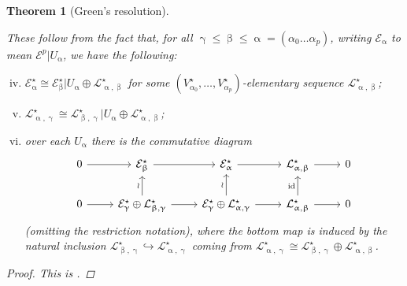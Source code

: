 \documentclass[11pt,fleqn]{article}
\theoremstyle{plain}
\newtheorem{theorem}{Theorem}[subsection]
\theoremstyle{definition}
\theoremstyle{remark}
\numberwithin{equation}{theorem}
\newcommand{\anotherbullet}{\star}
\newcommand{\restricted}{\mathbin{\big\vert}}
\newcommand{\id}{\mathrm{id}}
\begin{document}
\begin{theorem}[Green's resolution]
\begin{enumerate}[(i)]
            \end{enumerate}
            These follow from the fact that, for all ${\upgamma}\leqslant{\upbeta}\leqslant{\upalpha}=(\alpha_0\ldots\alpha_p)$, writing $\mathcal{E}_{\upalpha}$ to mean $\mathcal{E}^p\restricted U_{\upalpha}$, we have the following:
            \begin{enumerate}[(i)]
                \setcounter{enumi}{3}
                \item $\mathcal{E}_{\upalpha}^\anotherbullet \cong \mathcal{E}^\anotherbullet_{\upbeta}\restricted U_{\upalpha}\oplus \mathcal{L}_{{\upalpha},{\upbeta}}^\anotherbullet$ for some $(V^\anotherbullet_{\alpha_0},\ldots,V^\anotherbullet_{\alpha_p})$-elementary sequence $\mathcal{L}_{{\upalpha},{\upbeta}}^\anotherbullet$;
                \item $\mathcal{L}_{{\upalpha},{\upgamma}}^\anotherbullet \cong \mathcal{L}_{{\upbeta},{\upgamma}}^\anotherbullet\restricted U_{\upalpha}\oplus \mathcal{L}_{{\upalpha},{\upbeta}}^\anotherbullet$;
                \item over each $U_{\upalpha}$ there is the commutative diagram
                    \begin{equation*}
                        \begin{tikzcd}
                            0 \rar
                            &\mathcal{E}_{\upbeta}^\anotherbullet \rar
                            &\mathcal{E}_{\upalpha}^\anotherbullet \rar
                            &\mathcal{L}_{{\upalpha},{\upbeta}}^\anotherbullet \rar
                            &0\\
                            0 \rar
                            &\mathcal{E}_{\upgamma}^\anotherbullet\oplus \mathcal{L}_{{\upbeta},{\upgamma}}^\anotherbullet \rar \uar{\wr}
                            &\mathcal{E}_{\upgamma}^\anotherbullet\oplus \mathcal{L}_{{\upalpha},{\upgamma}}^\anotherbullet \rar \uar{\wr}
                            &\mathcal{L}_{{\upalpha},{\upbeta}}^\anotherbullet \rar \uar{\id}
                            &0
                        \end{tikzcd}
                    \end{equation*}
                    (omitting the restriction notation), where the bottom map is induced by the natural inclusion $\mathcal{L}_{{\upbeta},{\upgamma}}^\anotherbullet\hookrightarrow \mathcal{L}_{{\upalpha},{\upgamma}}^\anotherbullet$ coming from $\mathcal{L}_{{\upalpha},{\upgamma}}^\anotherbullet \cong \mathcal{L}_{{\upbeta},{\upgamma}}^\anotherbullet\oplus \mathcal{L}_{{\upalpha},{\upbeta}}^\anotherbullet$.
                \end{enumerate}

            \begin{proof}
                This is \cite[§1.4]{Green1980}.
            \end{proof}
        \end{theorem}
\end{document}
